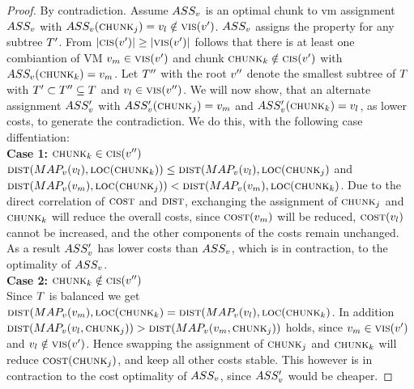 \begin{proof}
 By contradiction. Assume $ASS_v$ is an optimal chunk to vm 
assignment $ASS_v$ with $ASS_v(\textsc{chunk}_j) 
=v_l \notin \textsc{vis}(v')$. $ASS_v$ assigns 
the property for any subtree $T'$. From $|\textsc{cis}(v')| 
\geq 
|\textsc{vis}(v')|$ follows that there is at least one 
combiantion of 
VM 
$v_m \in \textsc{vis}(v')$ and chunk $\textsc{chunk}_k \notin 
\textsc{cis}(v')$ with $ASS_v(\textsc{chunk}_k) = 
v_m$. Let $T''$ with the root $v''$ denote the 
smallest subtree of $T$ with $T' \subset T'' \subseteq T$ and 
$v_l \in \textsc{vis}(v'')$. We will now show, that an 
alternate assignment $ASS_v'$ with 
$ASS_v'(\textsc{chunk}_j) = v_m$ and 
$ASS_v'(\textsc{chunk}_k) = v_l$, as lower costs, to generate 
the contradiction. We do this, with the following case diffentiation: 
\\
\textbf{Case 1:} $\textsc{chunk}_k \in \textsc{cis}(v'')$\\
$\textsc{dist}(MAP_v(v_l), \textsc{loc}(\textsc{chunk}_k)) \leq 
\textsc{dist}(MAP_v(v_l), \textsc{loc}(\textsc{chunk}_j)$ and 
$\textsc{dist}(MAP_v(v_m), \textsc{loc}(\textsc{chunk}_j)) < 
\textsc{dist}(MAP_v(v_m), \textsc{loc}(\textsc{chunk}_k)$. Due to the 
direct correlation of $\textsc{cost}$ and $\textsc{dist}$, exchanging the 
assignment of $\textsc{chunk}_j$ and $\textsc{chunk}_k$ will reduce the overall costs, since 
$\textsc{cost}(v_m)$ will be reduced, 
$\textsc{cost}(v_l)$ cannot be increased, and the other components 
of the costs remain unchanged. As a result $ASS_v'$ has lower 
costs than $ASS_v$, which is in contraction, to the optimality of
$ASS_v$.\\
\textbf{Case 2:} $\textsc{chunk}_k \notin \textsc{cis}(v'')$\\
Since $T$ is balanced we get $\textsc{dist}(MAP_v(v_m), 
\textsc{loc}(\textsc{chunk}_k)  = \textsc{dist}(MAP_v(v_l), 
\textsc{loc}(\textsc{chunk}_k)$. In addition $\textsc{dist}(MAP_v(v_l, 
\textsc{chunk}_j)) > \textsc{dist}(MAP_v(v_m, 
\textsc{chunk}_j)) $ holds, since $v_m \in \textsc{vis}(v')$ and 
$v_l \notin 
\textsc{vis}(v')$. Hence swapping the assignment of $\textsc{chunk}_j$ and 
$\textsc{chunk}_k$ will reduce $\textsc{cost}(\textsc{chunk}_j)$, and keep all other costs 
stable. This however is in contraction to the cost optimality of 
$ASS_v$, since $ASS_v'$ would be cheaper.
\end{proof}

